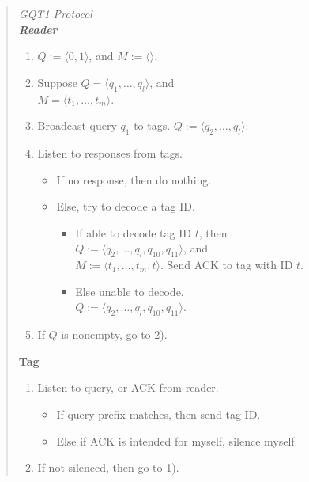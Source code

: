 \documentclass[conference]{IEEEtran}
\begin{document}
\begin{quote}
\begin{footnotesize}
\em GQT1 Protocol \em \\
\textbf{Reader}
\begin{enumerate}
\item $Q:=\langle0,1\rangle$, and $M:=\langle \rangle$.
\item Suppose $Q = \langle q_1, \ldots, q_l \rangle$, and \\$M = \langle t_1, \ldots, t_m\rangle$.
\item Broadcast query $q_1$ to tags.   $Q := \langle q_2, \ldots, q_l \rangle$.
\item Listen to responses from tags.
\begin{itemize}
\item If no response, then do nothing.
\item Else, try to decode a tag ID.

\begin{itemize}
\item If able to decode tag ID $t$, then \\$Q := \langle q_2, \ldots, q_l, q_10, q_11 \rangle$, and\\$M := \langle t_1, \ldots, t_m, t\rangle$. Send ACK to tag with ID $t$.
\item Else unable to decode.  \\$Q := \langle q_2, \ldots, q_l, q_10, q_11 \rangle$.
\end{itemize}

\end{itemize}
\item If $Q$ is nonempty, go to 2).
\end{enumerate}
\textbf{Tag}
\begin{enumerate}
\item Listen to query, or ACK from reader.
\begin{itemize}
\item If query prefix matches, then send tag ID.
\item Else if ACK is intended for myself, silence myself.
\end{itemize}
\item If not silenced, then go to 1).
\end{enumerate}
\end{footnotesize}
\end{quote}
\end{document}
